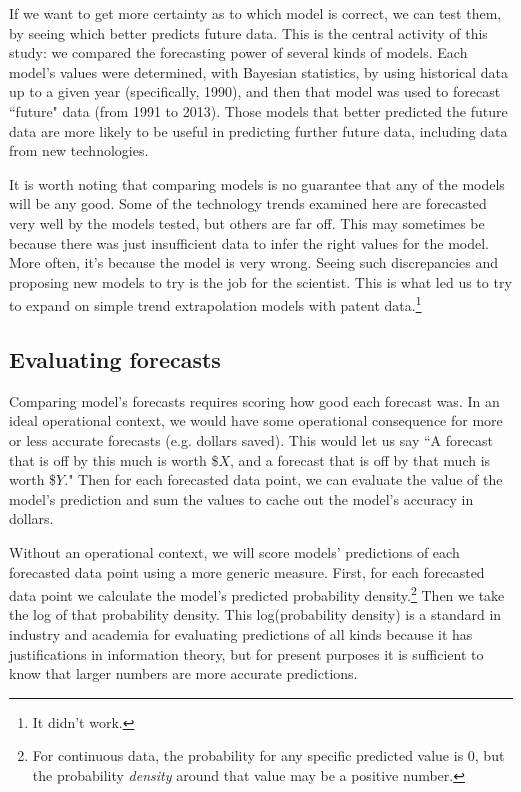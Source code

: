 \documentclass{article}
\begin{document}
If we want to get more certainty as to which model is correct, we can test them, by seeing which  better predicts future data. This is the central activity of this study: we compared the forecasting power of several kinds of models. Each model's values were determined, with Bayesian statistics, by using historical data up to a given year (specifically, 1990), and then that model was used to forecast ``future" data (from 1991 to 2013). Those models that better predicted the future data are more likely to be useful in predicting further future data, including data from new technologies.

It is worth noting that comparing models is no guarantee that any of the models will be any good. Some of the technology trends examined here are forecasted very well by the models tested, but others are far off. This may sometimes be because there was just insufficient data to infer the right values for the model. More often, it's because the model is very wrong. Seeing such discrepancies and proposing new models to try is the job for the scientist. This is what led us to try to expand on simple trend extrapolation models with patent data.\footnote{It didn't work.}

\subsection{Evaluating forecasts}
Comparing model's forecasts requires scoring how good each forecast was. In an ideal operational context, we would have some operational consequence for more or less accurate forecasts (e.g. dollars saved). This would let us say ``A forecast that is off by this much is worth \$$X$, and a forecast that is off by that much is worth \$$Y$." Then for each forecasted data point, we can evaluate the value of the model's prediction and sum the values to cache out the model's accuracy in dollars. 

Without an operational context, we will score models' predictions of each forecasted data point using a more generic measure. First, for each forecasted data point we calculate the model's predicted probability density.\footnote{For continuous data, the probability for any specific predicted value is 0, but the probability \textit{density} around that value may be a positive number.} Then we take the log of that probability density. This log(probability density) is a standard in industry and academia for evaluating predictions of all kinds because it has justifications in information theory, but for present purposes it is sufficient to know that larger numbers are more accurate predictions. 
\end{document}
